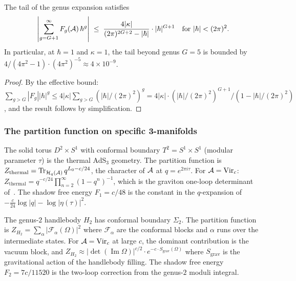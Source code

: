 \begin{corollary}
The tail of the genus expansion satisfies
\begin{equation}%
\left|\sum_{g=G+1}^{\infty} F_g(\cA)\,\hbar^g\right| \;\leq\; \frac{4|\kappa|}{(2\pi)^{2G+2} - |\hbar|} \cdot |\hbar|^{G+1} \quad\text{for } |\hbar| < (2\pi)^2.
\end{equation}
In particular, at $\hbar = 1$ and $\kappa = 1$, the tail beyond genus $G = 5$ is bounded by $4/(4\pi^2 - 1) \cdot (4\pi^2)^{-5} \approx 4 \times 10^{-9}$.
\end{corollary}

\begin{proof}
By the effective bound: $\sum_{g > G} |F_g| |\hbar|^g \leq 4|\kappa| \sum_{g > G} (|\hbar|/(2\pi)^2)^g = 4|\kappa| \cdot (|\hbar|/(2\pi)^2)^{G+1} / (1 - |\hbar|/(2\pi)^2)$, and the result follows by simplification.
\end{proof}

\subsubsection{The partition function on specific 3-manifolds}

\begin{example}
The solid torus $D^2 \times S^1$ with conformal boundary $T^2 = S^1 \times S^1$ (modular parameter $\tau$) is the thermal AdS$_3$ geometry. The partition function is $Z_{\mathrm{thermal}} = \operatorname{Tr}_{\mathcal{H}_q(\mathcal{A})} q^{L_0 - c/24}$, the character of $\mathcal{A}$ at $q = e^{2\pi i \tau}$. For $\mathcal{A} = \mathrm{Vir}_c$: $Z_{\mathrm{thermal}} = q^{-c/24}\prod_{n=2}^\infty (1-q^n)^{-1}$, which is the graviton one-loop determinant of~\cite{GMY08}. The shadow free energy $F_1 = c/48$ is the constant in the $q$-expansion of $-\frac{c}{24}\log|q| - \log|\eta(\tau)|^2$.
\end{example}

\begin{example}
The genus-$2$ handlebody $H_2$ has conformal boundary $\Sigma_2$. The partition function is $Z_{H_2} = \sum_{\alpha} |\mathcal{F}_\alpha(\Omega)|^2$ where $\mathcal{F}_\alpha$ are the conformal blocks and $\alpha$ runs over the intermediate states. For $\mathcal{A} = \mathrm{Vir}_c$ at large $c$, the dominant contribution is the vacuum block, and $Z_{H_2} \approx |\det(\operatorname{Im}\Omega)|^{c/2} \cdot e^{-c \cdot S_{\mathrm{grav}}(\Omega)}$ where $S_{\mathrm{grav}}$ is the gravitational action of the handlebody filling. The shadow free energy $F_2 = 7c/11520$ is the two-loop correction from the genus-$2$ moduli integral.
\end{example}

